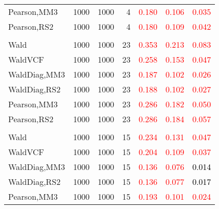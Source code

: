 \documentclass[
]{article}
\begin{document}
\begin{table}[H]
{\begin{tabular}[t]{lrrrrrr}
\hspace{1em}Pearson,MM3 & 1000 & 1000 & 4 & \textcolor{red}{0.180} & \textcolor{red}{0.106} & \textcolor{red}{0.035}\\
\hspace{1em}Pearson,RS2 & 1000 & 1000 & 4 & \textcolor{red}{0.180} & \textcolor{red}{0.109} & \textcolor{red}{0.042}\\
\addlinespace[0.3em]
\multicolumn{7}{l}{\textbf{1F 15V}}\\
\hspace{1em}Wald & 1000 & 1000 & 23 & \textcolor{red}{0.353} & \textcolor{red}{0.213} & \textcolor{red}{0.083}\\
\hspace{1em}WaldVCF & 1000 & 1000 & 23 & \textcolor{red}{0.258} & \textcolor{red}{0.153} & \textcolor{red}{0.047}\\
\hspace{1em}WaldDiag,MM3 & 1000 & 1000 & 23 & \textcolor{red}{0.187} & \textcolor{red}{0.102} & \textcolor{red}{0.026}\\
\hspace{1em}WaldDiag,RS2 & 1000 & 1000 & 23 & \textcolor{red}{0.188} & \textcolor{red}{0.102} & \textcolor{red}{0.027}\\
\hspace{1em}Pearson,MM3 & 1000 & 1000 & 23 & \textcolor{red}{0.286} & \textcolor{red}{0.182} & \textcolor{red}{0.050}\\
\hspace{1em}Pearson,RS2 & 1000 & 1000 & 23 & \textcolor{red}{0.286} & \textcolor{red}{0.184} & \textcolor{red}{0.057}\\
\addlinespace[0.3em]
\multicolumn{7}{l}{\textbf{2F 10V}}\\
\hspace{1em}Wald & 1000 & 1000 & 15 & \textcolor{red}{0.234} & \textcolor{red}{0.131} & \textcolor{red}{0.047}\\
\hspace{1em}WaldVCF & 1000 & 1000 & 15 & \textcolor{red}{0.204} & \textcolor{red}{0.109} & \textcolor{red}{0.037}\\
\hspace{1em}WaldDiag,MM3 & 1000 & 1000 & 15 & \textcolor{red}{0.136} & \textcolor{red}{0.076} & \textcolor{black}{0.014}\\
\hspace{1em}WaldDiag,RS2 & 1000 & 1000 & 15 & \textcolor{red}{0.136} & \textcolor{red}{0.077} & \textcolor{black}{0.017}\\
\hspace{1em}Pearson,MM3 & 1000 & 1000 & 15 & \textcolor{red}{0.193} & \textcolor{red}{0.101} & \textcolor{red}{0.024}\\

\end{tabular}}
\end{table}
\end{document}
